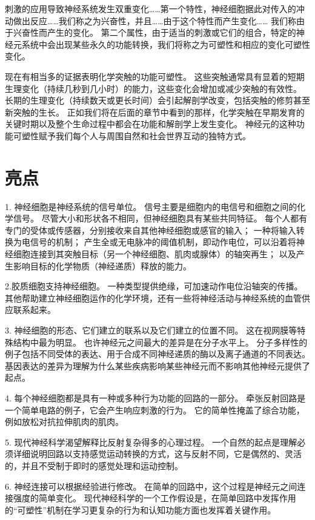 刺激的应用导致神经系统发生双重变化……第一个特性，神经细胞据此对传入的冲动做出反应……我们称之为兴奋性，并且……由于这个特性而产生变化…… 我们称由于兴奋性而产生的变化。
第二个属性，由于适当的刺激或它们的组合，特定的神经元系统中会出现某些永久的功能转换，我们将称之为可塑性和相应的变化可塑性变化。


现在有相当多的证据表明化学突触的功能可塑性。 
这些突触通常具有显着的短期生理变化（持续几秒到几小时）的能力，这些变化会增加或减少突触的有效性。 
长期的生理变化（持续数天或更长时间）会引起解剖学改变，包括突触的修剪甚至新突触的生长。 
正如我们将在后面的章节中看到的那样，化学突触在早期发育的关键时期以及整个生命过程中都会在功能和解剖学上发生变化。 
神经元的这种功能可塑性赋予我们每个人与周围自然和社会世界互动的独特方式。



\section{亮点}
1. 神经细胞是神经系统的信号单位。 信号主要是细胞内的电信号和细胞之间的化学信号。 
尽管大小和形状各不相同，但神经细胞具有某些共同特征。 
每个人都有专门的受体或传感器，分别接收来自其他神经细胞或感官的输入； 
一种将输入转换为电信号的机制； 产生全或无电脉冲的阈值机制，即动作电位，可以沿着将神经细胞连接到其突触目标（另一个神经细胞、肌肉或腺体）的轴突再生； 以及产生影响目标的化学物质（神经递质）释放的能力。


2.胶质细胞支持神经细胞。 
一种类型提供绝缘，可加速动作电位沿轴突的传播。 
其他帮助建立神经细胞运作的化学环境，还有一些将神经活动与神经系统的血管供应联系起来。


3. 神经细胞的形态、它们建立的联系以及它们建立的位置不同。 
这在视网膜等特殊结构中最为明显。 
也许神经元之间最大的差异是在分子水平上。 
分子多样性的例子包括不同受体的表达、用于合成不同神经递质的酶以及离子通道的不同表达。 
基因表达的差异为理解为什么某些疾病影响某些神经元而不影响其他神经元提供了起点。


4. 每个神经细胞都是具有一种或多种行为功能的回路的一部分。 
牵张反射回路是一个简单电路的例子，它会产生响应刺激的行为。 
它的简单性掩盖了综合功能，例如放松对抗拉伸肌肉的肌肉。


5. 现代神经科学渴望解释比反射复杂得多的心理过程。 
一个自然的起点是理解必须详细说明回路以支持感觉运动转换的方式，这与反射不同，它是偶然的、灵活的，并且不受制于即时的感觉处理和运动控制。


6. 神经连接可以根据经验进行修改。 
在简单的回路中，这个过程是神经元之间连接强度的简单变化。 
现代神经科学的一个工作假设是，在简单回路中发挥作用的“可塑性”机制在学习更复杂的行为和认知功能方面也发挥着关键作用。


%













